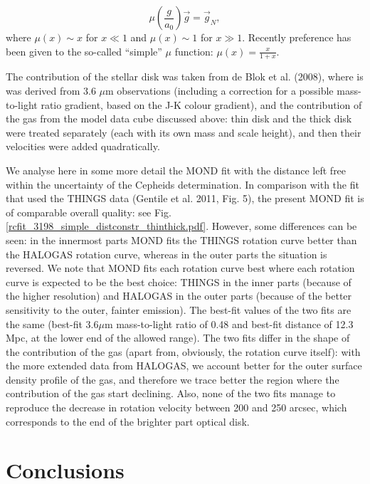 \documentclass[traditabstract]{aa}
\begin{document}
\begin{equation}
\mu\left(\frac{g}{a_{0}}\right)\vec{g} = \vec{g}_{N},
\label{eq:A}
\end{equation}
where
$\mu(x) \sim x$ for $x \ll 1$ and
$\mu(x) \sim 1$ for $x \gg 1$. Recently preference has been given to
the so-called ``simple'' $\mu$ function: $\mu(x) =\frac{x}{1+x}$. 


The contribution of the stellar disk was taken from de Blok et
al. (2008), where is was derived from 3.6 $\mu$m observations
(including a correction for a possible mass-to-light ratio gradient, based on
the J-K colour gradient), 
and the contribution of the
gas from the model data cube discussed above: thin disk
and the thick disk were treated separately (each with its own mass and
scale height), and then their velocities
were added quadratically. 

We analyse here in some more detail the MOND fit with the distance 
left free within the uncertainty of the Cepheids determination.
In comparison with the fit that used the THINGS data (Gentile et
al. 2011, Fig. 5), the present MOND fit is of comparable overall quality:
see Fig. \ref{rcfit_3198_simple_distconstr_thinthick.pdf}. However,
some differences can be seen: in the innermost parts MOND fits the
THINGS rotation curve better than the HALOGAS rotation curve, whereas
in the outer parts the situation is reversed. 
We note that MOND fits each rotation curve best where each rotation
curve is expected to be
the best choice: THINGS in the inner parts (because of the higher
resolution) and HALOGAS in the outer parts (because of the better
sensitivity to the outer, fainter emission).
The best-fit values of the
two fits are the same (best-fit 3.6$\mu$m mass-to-light ratio of 0.48
and best-fit distance of 12.3 Mpc, at the lower end of the allowed
range). The two fits differ in the shape of the contribution of the
gas (apart from, obviously, the rotation curve itself): 
with the more extended data from HALOGAS, we account better for the
outer surface density profile of the gas, and therefore we trace better the
region where the contribution of the gas start declining. Also, none
of the two fits manage to reproduce the decrease in rotation velocity
between 200 and 250 arcsec, which corresponds to the end
of the brighter part optical disk.

\section{Conclusions}
\end{document}
